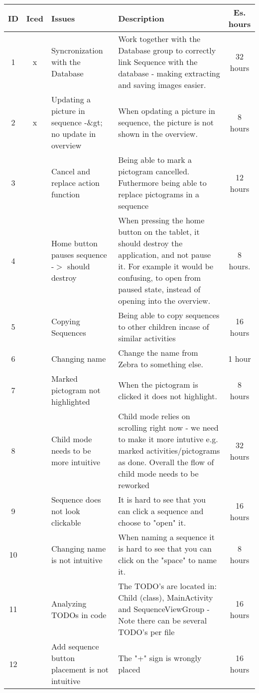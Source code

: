 
\begin{longtable} { | c | c | p{5cm} | p{5cm} | c | }
\hline
	ID 	&	Iced	&	Issues	&	Description		&	 Es. hours \\\hline
	1	& 	x	&	Syncronization with the Database		& 	Work together with the Database group to correctly link Sequence with the database - making extracting and saving images easier.	&	32 hours	\\\hline
	2	& 	x	&	Updating a picture in sequence -\&gt; no update in overview	&	When opdating a picture in sequence, the picture is not shown in the overview.	&	8 hours	\\\hline
	3	& 		&	Cancel and replace action function	&	Being able to mark a pictogram cancelled. Futhermore being able to replace pictograms in a sequence	&	12 hours \\\hline
	4	& 		&	Home button pauses sequence -$>$ should destroy	 &	When pressing the home button on the tablet, it should destroy the application, and not pause it. For example it would be confusing, to open from paused state, instead of opening into the overview.	&	8 hours.	\\\hline
	5	& 		&	Copying Sequences	&	Being able to copy sequences to other children incase of similar activities	&	16 hours \\\hline
	6	& 		&	Changing name	&	Change the name from Zebra to something else.	&	1 hour	\\\hline
	7	& 		&	Marked pictogram not highlighted		&	When the pictogram is clicked it does not highlight.	&	8 hours 	\\\hline
	8	& 		&	Child mode needs to be more intuitive		&	Child mode relies on scrolling right now - we need to make it more intutive e.g. marked activities/pictograms as done. Overall the flow of child mode needs to be reworked	&	32 hours	\\\hline
	9	& 		&	Sequence does not look clickable		&	It is hard to see that you can click a sequence and choose to "open" it.	&	16 hours	\\\hline
	10	& 		&	Changing name is not intuitive	&	When naming a sequence it is hard to see that you can click on the "space" to name it.	&	8 hours	\\\hline
	11	& 		&	Analyzing TODOs in code	&	The TODO's are located in: Child (class), MainActivity and SequenceViewGroup - Note there can be several TODO's per file		&	16 hours	\\\hline
	12	& 		&	Add sequence button placement is not intuitive	&	The "+" sign is wrongly placed	&	16 hours 	\\\hline

\end{longtable}
